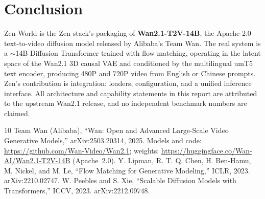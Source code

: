\documentclass[11pt,a4paper]{article}
\begin{document}
\section{Conclusion}

Zen-World is the Zen stack's packaging of \textbf{Wan2.1-T2V-14B}, the Apache-2.0 text-to-video
diffusion model released by Alibaba's Team Wan. The real system is a $\sim$14B Diffusion Transformer
trained with flow matching, operating in the latent space of the Wan2.1 3D causal VAE and
conditioned by the multilingual umT5 text encoder, producing 480P and 720P video from English or
Chinese prompts. Zen's contribution is integration: loaders, configuration, and a unified inference
interface. All architecture and capability statements in this report are attributed to the upstream
Wan2.1 release, and no independent benchmark numbers are claimed.

\begin{thebibliography}{10}
 Team Wan (Alibaba), ``Wan: Open and Advanced Large-Scale Video Generative Models,'' arXiv:2503.20314, 2025. Models and code: \url{https://github.com/Wan-Video/Wan2.1}; weights: \url{https://huggingface.co/Wan-AI/Wan2.1-T2V-14B} (Apache~2.0).
 Y. Lipman, R. T. Q. Chen, H. Ben-Hamu, M. Nickel, and M. Le, ``Flow Matching for Generative Modeling,'' ICLR, 2023. arXiv:2210.02747.
 W. Peebles and S. Xie, ``Scalable Diffusion Models with Transformers,'' ICCV, 2023. arXiv:2212.09748.
\end{thebibliography}
\end{document}
